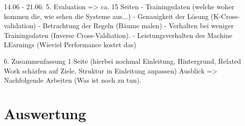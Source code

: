 14.06  - 21.06:
5. Evaluation => ca. 15 Seiten
- Trainingsdaten (welche woher kommen die, wie sehen die Systeme aus...)
- Genauigkeit der Lösung (K-Cross-validation)
- Betrachtung der Regeln (Bäume malen)
- Verhalten bei weniger Trainingsdaten (Inverse Cross-Valdiation).
- Leistungsverhalten des Machine LEarnings (Wieviel Performance kostet das)

6. Zusammenfassung 1 Seite (hierbei nochmal Einleitung, Hintergrund,
Related Work schärfen auf Ziele, Struktur in Einleitung anpassen)
Ausblick => Nachfolgende Arbeiten (Was ist noch zu tun).
\section{Auswertung}

